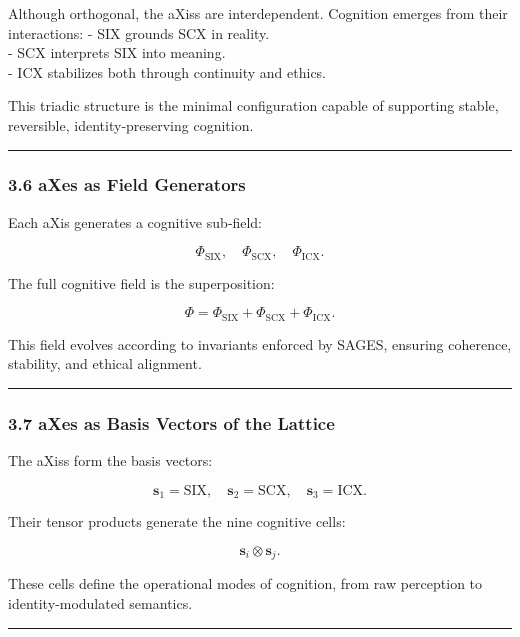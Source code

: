 Although orthogonal, the aXiss are interdependent. Cognition emerges from their interactions: - SIX grounds SCX in reality.\\
- SCX interprets SIX into meaning.\\
- ICX stabilizes both through continuity and ethics.

This triadic structure is the minimal configuration capable of supporting stable, reversible, identity‑preserving cognition.

\begin{center}\rule{0.5\linewidth}{0.5pt}\end{center}

\subsubsection{3.6 aXes as Field Generators}\label{axes-as-field-generators}

Each aXis generates a cognitive sub‑field:

\[
\Phi_{\text{SIX}}, \quad \Phi_{\text{SCX}}, \quad \Phi_{\text{ICX}}.
\]

The full cognitive field is the superposition:

\[
\Phi = \Phi_{\text{SIX}} + \Phi_{\text{SCX}} + \Phi_{\text{ICX}}.
\]

This field evolves according to invariants enforced by SAGES, ensuring coherence, stability, and ethical alignment.

\begin{center}\rule{0.5\linewidth}{0.5pt}\end{center}

\subsubsection{3.7 aXes as Basis Vectors of the Lattice}\label{axes-as-basis-vectors-of-the-lattice}

The aXiss form the basis vectors:

\[
\mathbf{s}_1 = \text{SIX}, \quad \mathbf{s}_2 = \text{SCX}, \quad \mathbf{s}_3 = \text{ICX}.
\]

Their tensor products generate the nine cognitive cells:

\[
\mathbf{s}_i \otimes \mathbf{s}_j.
\]

These cells define the operational modes of cognition, from raw perception to identity‑modulated semantics.

\begin{center}\rule{0.5\linewidth}{0.5pt}\end{center}

